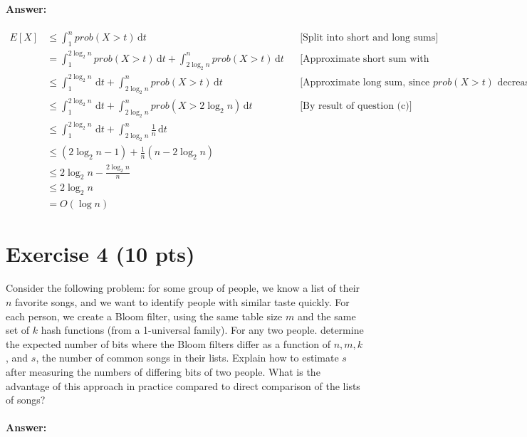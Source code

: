 \documentclass[a4paper]{article}
\begin{document}
\paragraph{Answer:}

\begin{align*}
E[X] & \le \int_1^n \! {prob}(X > t) \, \mathrm{d}t && \text{[Split into short and long sums]} \\
& = \int_1^{2 \log_2 n} \! {prob}(X > t) \, \mathrm{d}t + \int_{2 \log_2 n}^n \! {prob}(X > t) \, \mathrm{d}t && \text{[Approximate short sum with probability = 1]} \\
& \le \int_1^{2 \log_2 n} \! \, \mathrm{d}t + \int_{2 \log_2 n}^n \! {prob}(X > t) \, \mathrm{d}t && \text{[Approximate long sum, since ${prob}(X > t)$ decreases]} \\
& \le \int_1^{2 \log_2 n} \! \, \mathrm{d}t + \int_{2 \log_2 n}^n \! {prob}(X > 2 \log_2 n) \, \mathrm{d}t && \text{[By result of question (c)]}\\
& \le \int_1^{2 \log_2 n} \! \, \mathrm{d}t + \int_{2 \log_2 n}^n \! \frac{1}{n} \, \mathrm{d}t \\
& \le (2\log_2 n - 1) + \frac{1}{n} (n - 2\log_2 n) \\
& \le 2\log_2 n - \frac{2\log_2 n}{n} \\
& \le 2\log_2 n \\
& = O(\log n)
\end{align*}


\section{Exercise 4 (10 pts)}

\noindent Consider the following problem: for some group of people, we know a list of their $n$ favorite songs, and we want to identify people with similar taste quickly. For each person, we create a Bloom filter, using the same table size $m$ and the same set of $k$ hash functions (from a 1-universal family). For any two people. determine the expected number of bits where the Bloom filters differ as a function of $n, m, k$, and $s$, the number of common songs in their lists. Explain how to estimate $s$ after measuring the numbers of differing bits of two people. What is the advantage of this approach in practice compared to direct comparison of the lists of songs?

\paragraph{Answer:}
\end{document}
